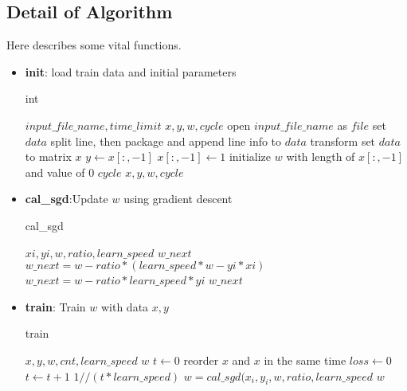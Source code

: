 \documentclass[conference,compsoc]{IEEEtran}
\renewcommand{\algorithmicrequire}{\textbf{Input:}}
\renewcommand{\algorithmicensure}{\textbf{Output:}}
\begin{document}
\subsection{Detail of Algorithm}
Here describes some vital functions.
\begin{itemize}
    \item \textbf{init}: load train data and initial parameters
    \begin{algorithm}[H]
     \caption{int}
     \begin{algorithmic}[1]
     \renewcommand{\algorithmicrequire}{\textbf{Input:}}
     \renewcommand{\algorithmicensure}{\textbf{Output:}}
     \REQUIRE $input\_file\_name, time\_limit$
     \ENSURE $x, y, w, cycle$
     \STATE open $input\_file\_name$ as $file$ 
     \STATE {}
     \STATE set $data$
          \STATE split line, then package and append line info to $data$
     \ENDFOR
     \STATE transform set $data$ to matrix $x$
     \STATE $y \leftarrow x[:,-1]$ 
     \STATE $x[:, -1] \leftarrow 1$
     \STATE initialize $w$ with length of $x[:, -1]$ and value of 0
     \STATE $cycle$
     \RETURN $x, y, w, cycle$
     \end{algorithmic}
   \end{algorithm}

   \item \textbf{cal\_sgd}:Update $w$ using gradient descent
     \begin{algorithm}[H]
     \caption{cal\_sgd}
     \begin{algorithmic}[2]
     \renewcommand{\algorithmicrequire}{\textbf{Input:}}
     \renewcommand{\algorithmicensure}{\textbf{Output:}}
     \REQUIRE $xi, yi, w, ratio, learn\_speed$
     \ENSURE $w\_next$ 
	     \STATE $w\_next = w - ratio*(learn\_speed*w - yi*xi)$
     \ELSE
	     \STATE $w\_next = w - ratio*learn\_speed*yi$
     \ENDIF
     \RETURN $w\_next$
     \end{algorithmic}
     \end{algorithm}

  \item \textbf{train}: Train $w$ with data $x, y$
    \begin{algorithm}[H]
     \caption{train}
     \begin{algorithmic}[3]
     \renewcommand{\algorithmicrequire}{\textbf{Input:}}
     \renewcommand{\algorithmicensure}{\textbf{Output:}}
     \REQUIRE $x, y, w, cnt, learn\_speed$
     \ENSURE  $w$
     \STATE $t \leftarrow 0$
	     \STATE reorder $x$ and $x$ in the same time
	     \STATE $loss \leftarrow 0$ 
	     \STATE $t \leftarrow t+1$
	     \STATE $1//(t*learn\_speed)$
	          \STATE $w = cal\_sgd(x_i, y_i, w, ratio, learn\_speed$
	     \ENDFOR
     \ENDWHILE
     \RETURN $w$
     \end{algorithmic}
     \end{algorithm}
 

\end{itemize}
\end{document}
